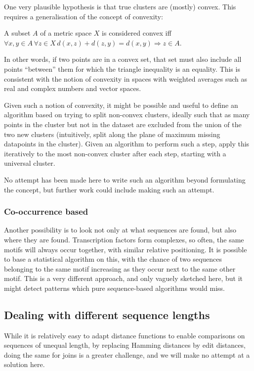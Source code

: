 \documentclass[fleqn]{book}
\begin{document}
One very plausible hypothesis is that true clusters are (mostly) convex.
This requires a generalisation of the concept of convexity:

A subset \(A\) of a metric space \(X\) is considered convex iff
\(\forall x, y \in A \, \forall z \in X \, d(x,z) + d(z,y) = d(x,y) \Rightarrow z \in A\).

In other words, if two points are in a convex set, that set must also
include all points ``between'' them for which the triangle inequality is
an equality. This is consistent with the notion of convexity in spaces
with weighted averages such as real and complex numbers and vector
spaces.

Given such a notion of convexity, it might be possible and useful to
define an algorithm based on trying to split non-convex clusters,
ideally such that as many points in the cluster but not in the dataset
are excluded from the union of the two new clusters (intuitively, split
along the plane of maximum missing datapoints in the cluster). Given an
algorithm to perform such a step, apply this iteratively to the most
non-convex cluster after each step, starting with a universal cluster.

No attempt has been made here to write such an algorithm beyond
formulating the concept, but further work could include making such an
attempt.

\subsubsection{Co-occurrence based}\label{co-occurrence-based}

Another possibility is to look not only at what sequences are found, but
also where they are found. Transcription factors form complexes, so
often, the same motifs will always occur together, with similar relative
positioning. It is possible to base a statistical algorithm on this,
with the chance of two sequences belonging to the same motif increasing
as they occur next to the same other motif. This is a very different
approach, and only vaguely sketched here, but it might detect patterns
which pure sequence-based algorithms would miss.

\subsection{Dealing with different sequence
lengths}\label{dealing-with-different-sequence-lengths}

While it is relatively easy to adapt distance functions to enable
comparisons on sequences of unequal length, by replacing Hamming
distances by edit distances, doing the same for joins is a greater
challenge, and we will make no attempt at a solution here.
\end{document}
